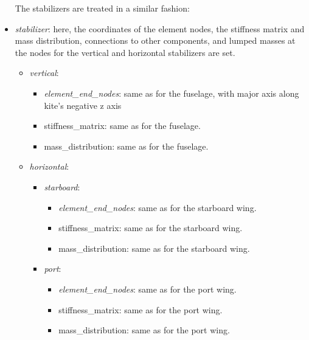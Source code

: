\documentclass[report]{nrel}
\begin{document}
\begin{itemize}
The stabilizers are treated in a similar fashion:
 	\item \emph{stabilizer}: here, the coordinates of the element nodes, the stiffness matrix and mass distribution, connections to other components, and lumped masses at the nodes for the vertical and horizontal stabilizers are set.
%
	 \begin{itemize}
	 	\item \emph{vertical}:
 		\begin{itemize}
 			\item \emph{element\_end\_nodes}: same as for the fuselage, with major axis along kite's negative z axis
	 		\item {stiffness\_matrix}: same as for the fuselage.
	 		\item {mass\_distribution}: same as for the fuselage.
	 	\end{itemize}
 	\item \emph{horizontal}:
	 	\begin{itemize}
 			\item \emph{starboard}:	
		 	\begin{itemize}
 				\item \emph{element\_end\_nodes}: same as for the starboard wing.
		 		\item {stiffness\_matrix}: same as for the starboard wing.
		 		\item {mass\_distribution}: same as for the starboard wing.
		 	\end{itemize}
	 	\item \emph{port}:	
	 	\begin{itemize}
	 		\item \emph{element\_end\_nodes}: same as for the port wing.
	 		\item {stiffness\_matrix}: same as for the port wing.
	 		\item {mass\_distribution}: same as for the port wing.
	 	\end{itemize}
	 \end{itemize}
	\end{itemize}


\end{itemize}
\end{document}
